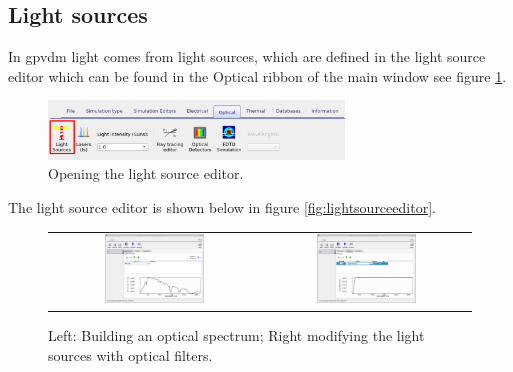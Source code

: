 \subsection{Light sources}
In gpvdm light comes from light sources, which are defined in the light source editor which can be found in the Optical ribbon of the main window see figure \ref{fig:opticalribbon}.

\begin{figure}[H]
\centering
\includegraphics[width=0.7\textwidth]{./images/light_ribbon.png}
\caption{Opening the light source editor.}
\label{fig:opticalribbon}
\end{figure}

The light source editor is shown below in figure \ref{fig:lightsourceeditor}.
\begin{figure}[H]
\centering
\begin{tabular}{ c c }

\includegraphics[width=0.5\textwidth,height=0.4\textwidth]{./images/lights0.png}

&
\includegraphics[width=0.5\textwidth,height=0.4\textwidth]{./images/lights1.png}
\\
\end{tabular}
\caption{Left: Building an optical spectrum; Right modifying the light sources with optical filters.}
\end{figure}


